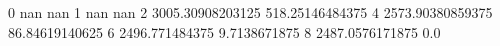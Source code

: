 0 nan nan
1 nan nan
2 3005.30908203125 518.25146484375
4 2573.90380859375 86.84619140625
6 2496.771484375 9.7138671875
8 2487.0576171875 0.0
